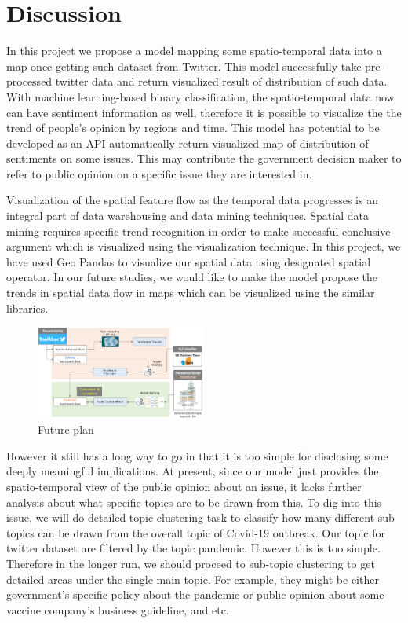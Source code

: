 \section{Discussion}
In this project we propose a model mapping some spatio-temporal data into a
map once getting such dataset from Twitter. This model successfully take
pre-processed twitter data and return visualized result of distribution of
such data. With machine learning-based binary classification, the
spatio-temporal data now can have sentiment information as well, therefore it
is possible to visualize the the trend of people's opinion by regions and
time. This model has potential to be developed as an API automatically return
visualized map of distribution of sentiments on some issues. This may
contribute the government decision maker to refer to public opinion on a
specific issue they are interested in. 

Visualization of the spatial feature flow as the temporal data progresses is
an integral part of data warehousing and data mining techniques. Spatial data
mining requires specific trend recognition in order to make successful
conclusive argument which is visualized using the visualization technique. In
this project, we have used Geo Pandas to visualize our spatial data using
designated spatial operator. In our future studies, we would like to make the
model propose the trends in spatial data flow in maps which can be visualized
using the similar libraries.\\

\begin{figure}[H]
\centering
\includegraphics[width=0.5\textwidth]{imgs/Research_Process.png}
\caption{\label{fig:Research process}Future plan}
\end{figure}

However it still has a long way to go in that it is too simple for disclosing
some deeply meaningful implications. At present, since our model just
provides the spatio-temporal view of the public opinion about an issue, it
lacks further analysis about what specific topics are to be drawn from this.
To dig into this issue, we will do detailed topic clustering task to classify
how many different sub topics can be drawn from the overall topic of Covid-19
outbreak. Our topic for twitter dataset are filtered by the topic pandemic.
However this is too simple. Therefore in the longer run, we should proceed to
sub-topic clustering to get detailed areas under the single main topic. For
example, they might be either government's specific policy about the pandemic
or public opinion about some vaccine company's business guideline, and etc.

